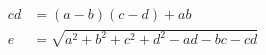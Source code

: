 \begin{align*}
cd &= (a - b)(c - d ) + ab \\
e &= \sqrt{a^2 + b^2 + c^2 + d^2 - ad - bc - cd}
\end{align*}